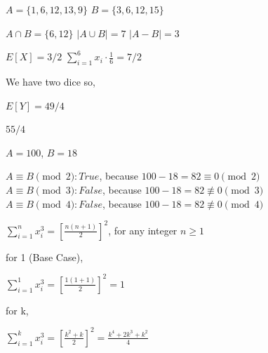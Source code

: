 \documentclass[12pt,twoside]{article}
\begin{document}

\begin{problems}

\problem  %

$A = \{1, 6, 12, 13, 9\}$
$B = \{3, 6, 12, 15\}$

\begin{problemparts}
\problempart %
$A \cap B = \{6, 12\}$
\problempart %
$|A \cup B| = 7$
\problempart %
$|A - B| = 3$
\end{problemparts}

\problem  %

\begin{problemparts}
\problempart %
$E[X] = 3 / 2$
\problempart %
$\sum_{i=1}^{6} x_i \cdot \frac{1}{6} = 7/2$

We have two dice so,

$E[Y] = 49/4$
\problempart %

$55/4$

\end{problemparts}

\problem  %

$A = 100$, $B = 18$

\begin{problemparts}
\problempart %
$A \equiv B \pmod{2} : True$, because $100-18 = 82 \equiv 0 \pmod{2}$
\problempart %
$A \equiv B \pmod{3} : False$, because $100-18 = 82  \not\equiv 0 \pmod{3}$
\problempart %
$A \equiv B \pmod{4} : False$, because $100-18 = 82 \not\equiv 0 \pmod{4}$
\end{problemparts}

\problem  %

$\sum_{i=1}^{n} x_i^3 = [\frac{n(n + 1)}{2}]^2$, for any integer $n \geq 1$

for 1 (Base Case),

$\sum_{i=1}^{1} x_i^3 = [\frac{1(1 + 1)}{2}]^2 = 1$

for k,

$\sum_{i=1}^{k} x_i^3 = [\frac{k^2 + k}{2}]^2 = \frac{k^4 + 2k^3 + k^2}{4}$


\end{problems}
\end{document}
